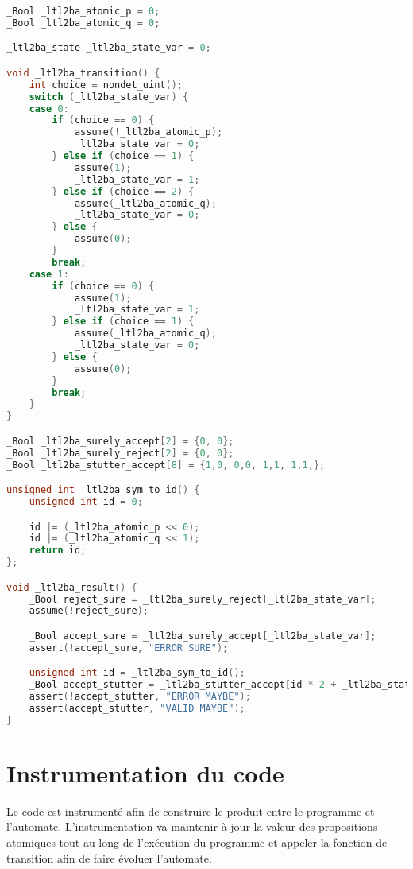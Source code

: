 \begin{lstlisting}[language=C]
_Bool _ltl2ba_atomic_p = 0;
_Bool _ltl2ba_atomic_q = 0;

_ltl2ba_state _ltl2ba_state_var = 0;

void _ltl2ba_transition() {
    int choice = nondet_uint();
    switch (_ltl2ba_state_var) {
    case 0:
        if (choice == 0) {
            assume(!_ltl2ba_atomic_p);
            _ltl2ba_state_var = 0;
        } else if (choice == 1) {
            assume(1);
            _ltl2ba_state_var = 1;
        } else if (choice == 2) {
            assume(_ltl2ba_atomic_q);
            _ltl2ba_state_var = 0;
        } else {
            assume(0);
        }
        break;
    case 1:
        if (choice == 0) {
            assume(1);
            _ltl2ba_state_var = 1;
        } else if (choice == 1) {
            assume(_ltl2ba_atomic_q);
            _ltl2ba_state_var = 0;
        } else {
            assume(0);
        }
        break;
    }
}

_Bool _ltl2ba_surely_accept[2] = {0, 0};
_Bool _ltl2ba_surely_reject[2] = {0, 0};
_Bool _ltl2ba_stutter_accept[8] = {1,0, 0,0, 1,1, 1,1,};

unsigned int _ltl2ba_sym_to_id() {
    unsigned int id = 0;

    id |= (_ltl2ba_atomic_p << 0);
    id |= (_ltl2ba_atomic_q << 1);
    return id;
};

void _ltl2ba_result() {
    _Bool reject_sure = _ltl2ba_surely_reject[_ltl2ba_state_var];
    assume(!reject_sure);

    _Bool accept_sure = _ltl2ba_surely_accept[_ltl2ba_state_var];
    assert(!accept_sure, "ERROR SURE");

    unsigned int id = _ltl2ba_sym_to_id();
    _Bool accept_stutter = _ltl2ba_stutter_accept[id * 2 + _ltl2ba_state_var];
    assert(!accept_stutter, "ERROR MAYBE");
    assert(accept_stutter, "VALID MAYBE");
}
\end{lstlisting}

\section{Instrumentation du code}

Le code est instrumenté afin de construire le produit entre le programme
et l'automate. L'instrumentation va maintenir à jour la valeur des
propositions atomiques tout au long de l'exécution du programme et
appeler la fonction de transition afin de faire évoluer l'automate.

